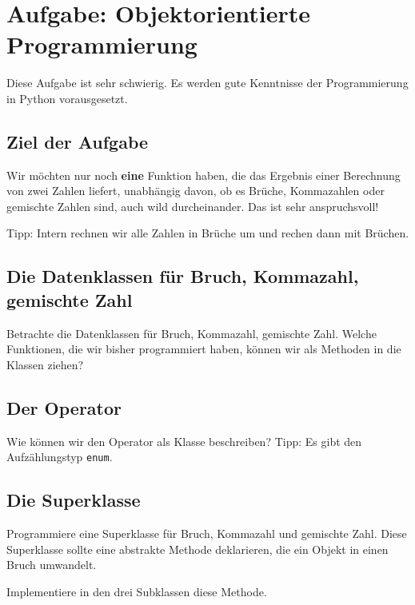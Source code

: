 \section{Aufgabe: Objektorientierte Programmierung}

Diese Aufgabe ist sehr schwierig. Es werden gute Kenntnisse der Programmierung in Python vorausgesetzt.

\subsection*{Ziel der Aufgabe}

Wir möchten nur noch \textbf{eine} Funktion haben, die das Ergebnis einer Berechnung von zwei Zahlen liefert, unabhängig davon, ob es Brüche, Kommazahlen oder gemischte Zahlen sind, auch wild durcheinander. Das ist sehr anspruchsvoll!

Tipp: Intern rechnen wir alle Zahlen in Brüche um und rechen dann mit Brüchen.

\subsection*{Die Datenklassen für Bruch, Kommazahl, gemischte Zahl}

Betrachte die Datenklassen für Bruch, Kommazahl, gemischte Zahl. Welche Funktionen, die wir bisher programmiert haben, können wir als Methoden in die Klassen ziehen?

\subsection*{Der Operator}

Wie können wir den Operator als Klasse beschreiben? Tipp: Es gibt den Aufzählungstyp \texttt{enum}.

\subsection*{Die Superklasse}

Programmiere eine Superklasse für Bruch, Kommazahl und gemischte Zahl. Diese Superklasse sollte eine abstrakte Methode deklarieren, die ein Objekt in einen Bruch umwandelt.

Implementiere in den drei Subklassen diese Methode.